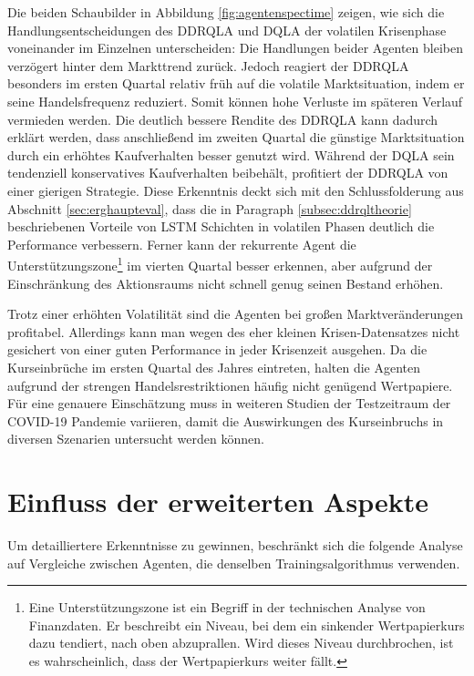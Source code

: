 Die beiden Schaubilder in Abbildung \ref{fig:agentenspectime} zeigen, wie sich die Handlungsentscheidungen des \acs{DDRQLA} und \acs{DQLA} der volatilen Krisenphase voneinander im Einzelnen unterscheiden:
Die Handlungen beider Agenten bleiben verzögert hinter dem Markttrend zurück. Jedoch reagiert der \acs{DDRQLA} besonders im ersten Quartal relativ früh auf die volatile Marktsituation, indem er seine Handelsfrequenz reduziert. Somit können hohe Verluste im späteren Verlauf vermieden werden.
Die deutlich bessere Rendite des \acs{DDRQLA} kann dadurch erklärt werden, dass anschließend im zweiten Quartal die günstige Marktsituation durch ein erhöhtes Kaufverhalten besser genutzt wird. 
Während der \acs{DQLA} sein tendenziell konservatives Kaufverhalten beibehält, profitiert der \acs{DDRQLA} von einer gierigen Strategie.
Diese Erkenntnis deckt sich mit den Schlussfolderung aus Abschnitt \ref{sec:erghaupteval}, dass die in Paragraph \ref{subsec:ddrqltheorie} beschriebenen Vorteile von \acs{LSTM} Schichten in volatilen Phasen deutlich die Performance verbessern.
Ferner kann der rekurrente Agent die Unterstützungszone\footnote{Eine Unterstützungszone ist ein Begriff in der technischen Analyse von Finanzdaten. Er beschreibt ein Niveau, bei dem ein sinkender Wertpapierkurs dazu tendiert, nach oben abzuprallen. Wird dieses Niveau durchbrochen, ist es wahrscheinlich, dass der Wertpapierkurs weiter fällt.} im vierten Quartal besser erkennen, aber aufgrund der Einschränkung des Aktionsraums nicht schnell genug seinen Bestand erhöhen.

Trotz einer erhöhten Volatilität sind die Agenten bei großen Marktveränderungen profitabel. 
Allerdings kann man wegen des eher kleinen Krisen-Datensatzes nicht gesichert von einer guten Performance in jeder Krisenzeit ausgehen. 
Da die Kurseinbrüche im ersten Quartal des Jahres eintreten, halten die Agenten aufgrund der strengen Handelsrestriktionen häufig nicht genügend Wertpapiere.
Für eine genauere Einschätzung muss in weiteren Studien der Testzeitraum der COVID-19 Pandemie variieren, damit die Auswirkungen des Kurseinbruchs in diversen Szenarien untersucht werden können.

\section{Einfluss der erweiterten Aspekte}
\label{sec:erweiterteragent}

Um detailliertere Erkenntnisse zu gewinnen, beschränkt sich die folgende Analyse auf Vergleiche zwischen Agenten, die denselben Trainingsalgorithmus verwenden.

